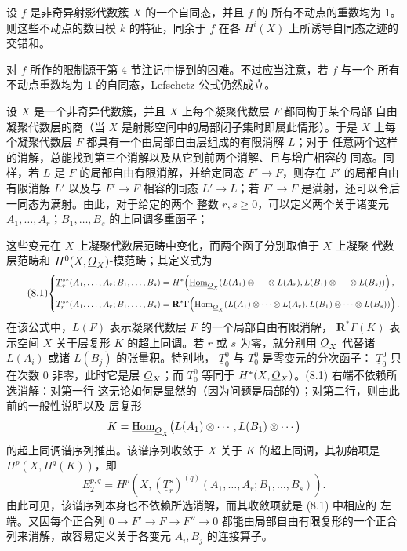  设 $f$ 是非奇异射影代数簇 $X$ 的一个自同态，并且 $f$ 的
所有不动点的重数均为 1。则这些不动点的数目模 $k$ 的特征，同余于 $f$ 在各
$H^{i}(X)$ 上所诱导自同态之迹的交错和。

对 $f$ 所作的限制源于第 4 节注记中提到的困难。不过应当注意，若 $f$ 与一个
所有不动点重数均为 1 的自同态，Lefschetz 公式仍然成立。


设 $X$ 是一个非奇异代数簇，并且 $X$ 上每个凝聚代数层 $F$ 都同构于某个局部
自由凝聚代数层的商（当 $X$ 是射影空间中的局部闭子集时即属此情形）。于是
$X$ 上每个凝聚代数层 $F$ 都具有一个由局部自由层组成的有限消解 $L$；对于
任意两个这样的消解，总能找到第三个消解以及从它到前两个消解、且与增广相容的
同态。同样，若 $L$ 是 $F$ 的局部自由有限消解，并给定同态
$F'\longrightarrow F$，则存在 $F'$ 的局部自由有限消解 $L'$ 以及与
$F'\longrightarrow F$ 相容的同态 $L'\longrightarrow L$；若
$F'\longrightarrow F$ 是满射，还可以令后一同态为满射。由此，对于给定的两个
整数 $r,s\geq0$，可以定义两个关于诸变元
$A_1,\ldots,A_r$；$B_1,\ldots,B_s$ 的上同调多重函子；

这些变元在 $X$ 上凝聚代数层范畴中变化，而两个函子分别取值于 $X$ 上凝聚
代数层范畴和 $H^{0}(X,\underline{O}_X)$-模范畴；其定义式为
\begin{equation}\tag{8.1}
\resizebox{\textwidth}{!}{$
\left\{
\begin{aligned}
\underline{T}_{r}^{s*}(A_1,\ldots,A_r;B_1,\ldots,B_s)
  &={}H^{*}\!\left(
    \Homsh_{\Osh_X}\!\left(
      L(A_1)\otimes\cdots\otimes L(A_r),
      L(B_1)\otimes\cdots\otimes L(B_s)
    \right)\right),\\[3pt]
T_{r}^{s*}(A_1,\ldots,A_r;B_1,\ldots,B_s)
  &={}\mathbf R^{*}\Gamma\!\left(
    \Homsh_{\Osh_X}\!\left(
      L(A_1)\otimes\cdots\otimes L(A_r),
      L(B_1)\otimes\cdots\otimes L(B_s)
    \right)\right).
\end{aligned}
\right.
$}
\end{equation}
在该公式中，$L(F)$ 表示凝聚代数层 $F$ 的一个局部自由有限消解，
$\mathbf R^{*}\Gamma(K)$ 表示空间 $X$ 关于层复形 $K$ 的超上同调。若 $r$ 或
$s$ 为零，就分别用 $\underline{O}_X$ 代替诸 $L(A_i)$ 或诸 $L(B_j)$ 的张量积。特别地，
$\underline{T}_{0}^{0}$ 与 $T_{0}^{0}$ 是零变元的分次函子：
$\underline{T}_{0}^{0}$ 只在次数 0 非零，此时它是层 $\underline{O}_X$；而
$T_{0}^{0}$ 等同于 $H^{*}(X,\underline{O}_X)$。(8.1) 右端不依赖所选消解：对第一行
这无论如何是显然的（因为问题是局部的）；对第二行，则由此前的一般性说明以及
层复形
\[
  K=\underline{\operatorname{Hom}}_{\underline{O}_X}\bigl(L(A_1)\otimes\cdots,
      L(B_1)\otimes\cdots\bigr)
\]
的超上同调谱序列推出。该谱序列收敛于 $X$ 关于 $K$ 的超上同调，其初始项是
$H^{p}(X,H^{q}(K))$，即
\begin{equation}\tag{8.2}
  E_{2}^{p,q}
  =H^{p}\!\left(X,
    (\underline{T}_{r}^{s})^{(q)}
      (A_1,\ldots,A_r;B_1,\ldots,B_s)\right).
\end{equation}
由此可见，该谱序列本身也不依赖所选消解，而其收敛项就是 (8.1) 中相应的
左端。又因每个正合列
$0\longrightarrow F'\longrightarrow F\longrightarrow F''\longrightarrow0$
都能由局部自由有限复形的一个正合列来消解，故容易定义关于各变元
$A_i,B_j$ 的连接算子。

